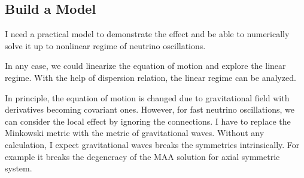 \documentclass[letterpaper,12pt,english]{sphinxmanual}
\begin{document}
\subsection{Build a Model}
\label{\detokenize{gravity/gravitational-waves:build-a-model}}
I need a practical model to demonstrate the effect and be able to numerically solve it up to nonlinear regime of neutrino oscillations.

In any case, we could linearize the equation of motion and explore the linear regime. With the help of dispersion relation, the linear regime can be analyzed.

In principle, the equation of motion is changed due to gravitational field with derivatives becoming covariant ones. However, for fast neutrino oscillations, we can consider the local effect by ignoring the connections. I have to replace the Minkowski metric with the metric of gravitational waves. Without any calculation, I expect gravitational waves breaks the symmetrics intrinsically. For example it breaks the degeneracy of the MAA solution for axial symmetric system.
\end{document}
